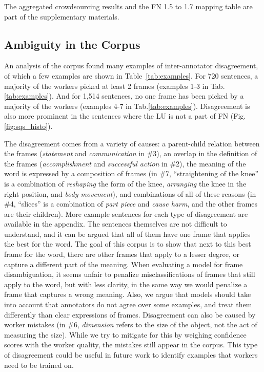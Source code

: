 The aggregated crowdsourcing results and the FN 1.5 to 1.7 mapping table are part of the supplementary materials.


\subsection{Ambiguity in the Corpus}

An analysis of the corpus found many examples of inter-annotator disagreement, of which a few examples are shown in Table~\ref{tab:examples}. For 720 sentences, a majority of the workers picked at least 2 frames (examples 1-3 in Tab.\ref{tab:examples}). And for 1,514 sentences, no one frame has been picked by a majority of the workers (examples 4-7 in Tab.\ref{tab:examples}). Disagreement is also more prominent in the sentences where the LU is not a part of FN (Fig.\ref{fig:sqs_histo}).

The disagreement comes from a variety of causes: a parent-child relation between the frames (\textit{statement} and \textit{communication} in \#3), an overlap in the definition of the frames (\textit{accomplishment} and \textit{successful action} in \#2), the meaning of the word is expressed by a composition of frames (in \#7, ``straightening of the knee'' is a combination of \textit{reshaping} the form of the knee, \textit{arranging} the knee in the right position, and \textit{body movement}), and combinations of all of these reasons (in \#4, ``slices'' is a combination of \textit{part piece} and \textit{cause harm}, and the other frames are their children). More example sentences for each type of disagreement are available in the appendix. The sentences themselves are not difficult to understand, and it can be argued that all of them have one frame that applies the best for the word. The goal of this corpus is to show that next to this best frame for the word, there are other frames that apply to a lesser degree, or capture a different part of the meaning. When evaluating a model for frame disambiguation, it seems unfair to penalize misclassifications of frames that still apply to the word, but with less clarity, in the same way we would penalize a frame that captures a wrong meaning. Also, we argue that models should take into account that annotators do not agree over some examples, and treat them differently than clear expressions of frames. Disagreement can also be caused by worker mistakes (in \#6, \textit{dimension} refers to the size of the object, not the act of measuring the size). While we try to mitigate for this by weighing confidence scores with the worker quality, the mistakes still appear in the corpus. This type of disagreement could be useful in future work to identify examples that workers need to be trained on.

